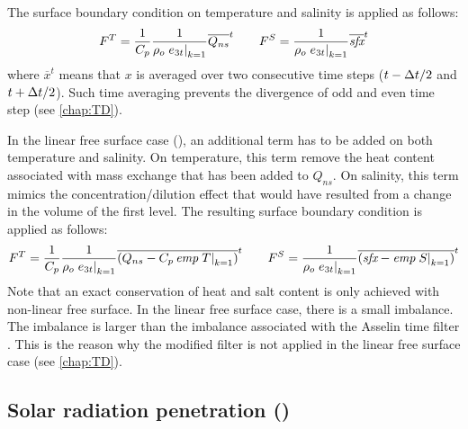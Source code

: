\documentclass[../main/NEMO_manual]{subfiles}
\begin{document}
The surface boundary condition on temperature and salinity is applied as follows:
\begin{equation}
  \label{eq:TRA_sbc}
    F^T = \frac{1}{C_p} \frac{1}{\rho_o \left. e_{3t} \right|_{k = 1}} \overline{Q_{ns}      }^t \qquad
    F^S =               \frac{1}{\rho_o \left. e_{3t} \right|_{k = 1}} \overline{\textit{sfx}}^t
\end{equation}
where $\overline x^t$ means that $x$ is averaged over two consecutive time steps
($t - \Delta t / 2$ and $t + \Delta t / 2$).
Such time averaging prevents the divergence of odd and even time step (see \autoref{chap:TD}).

In the linear free surface case (),
an additional term has to be added on both temperature and salinity.
On temperature, this term remove the heat content associated with
mass exchange that has been added to $Q_{ns}$.
On salinity, this term mimics the concentration/dilution effect that would have resulted from
a change in the volume of the first level.
The resulting surface boundary condition is applied as follows:
\begin{equation}
  \label{eq:TRA_sbc_lin}
    F^T = \frac{1}{C_p} \frac{1}{\rho_o \left. e_{3t} \right|_{k = 1}}
          \overline{(Q_{ns}       - C_p \, \textit{emp} \left. T \right|_{k = 1})}^t \qquad
    F^S =               \frac{1}{\rho_o \left. e_{3t} \right|_{k = 1}}
          \overline{(\textit{sfx} -        \textit{emp} \left. S \right|_{k = 1})}^t
\end{equation}
Note that an exact conservation of heat and salt content is only achieved with
non-linear free surface.
In the linear free surface case, there is a small imbalance.
The imbalance is larger than the imbalance associated with the Asselin time filter
\citep{leclair.madec_OM09}.
This is the reason why the modified filter is not applied in the linear free surface case
(see \autoref{chap:TD}).

\subsection[Solar radiation penetration (\textit{traqsr.F90})]{Solar radiation penetration (\protect{})}
\label{subsec:TRA_qsr}

\begin{listing}
  \caption{}
  \label{lst:namtra_qsr}
\end{listing}
\end{document}
